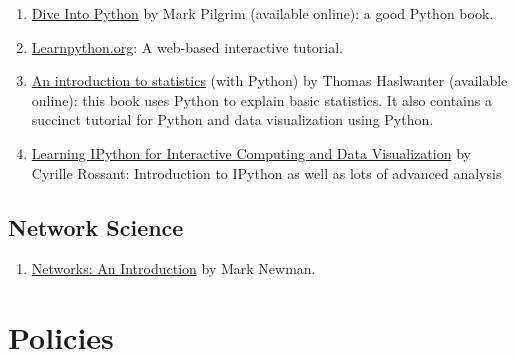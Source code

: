 \documentclass[11pt,article,oneside]{memoir}
\begin{document}
\begin{enumerate}

\item \href{http://www.diveintopython3.net/index.html}{Dive Into Python} by Mark Pilgrim (available online): a good Python book. 

\item \href{http://www.learnpython.org}{Learnpython.org}: A web-based interactive tutorial. 

\item \href{http://work.thaslwanter.at/Stats/html/}{An introduction to statistics} (with Python) by Thomas Haslwanter (available online): this book uses Python to explain basic statistics. It also contains a succinct tutorial for Python and data visualization using Python. 

\item \href{http://ipython.rossant.net}{Learning IPython for Interactive Computing and Data Visualization} by  Cyrille Rossant: Introduction to IPython as well as lots of advanced analysis 


\end{enumerate}

\subsection{Network Science}

\begin{enumerate}

\item \href{https://www.amazon.com/Networks-Introduction-Mark-Newman/dp/0199206651}{Networks: An Introduction} by Mark Newman. 

\end{enumerate}

\section{Policies}
\end{document}
